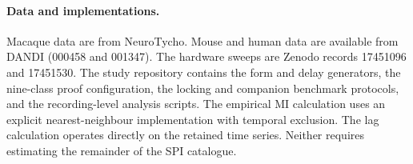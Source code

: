 \paragraph{Data and implementations.}
Macaque data are from NeuroTycho. Mouse and human data are available from DANDI (000458 and 001347). The hardware sweeps are Zenodo records 17451096 and 17451530. The study repository contains the form and delay generators, the nine-class proof configuration, the locking and companion benchmark protocols, and the recording-level analysis scripts. The empirical MI calculation uses an explicit nearest-neighbour implementation with temporal exclusion. The lag calculation operates directly on the retained time series. Neither requires estimating the remainder of the SPI catalogue.
